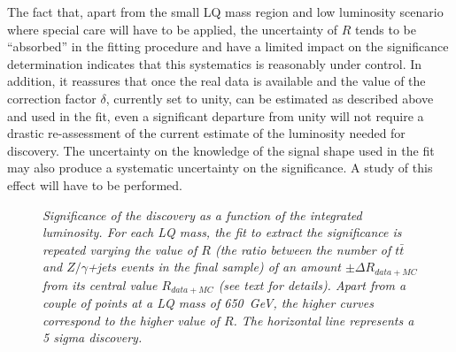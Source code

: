 The fact that, apart from the small LQ mass region and low luminosity scenario where special care
will have to be applied, the uncertainty 
of $R$ tends to be ``absorbed'' in the fitting procedure and have a limited impact on the 
significance determination indicates that this systematics is reasonably under control. 
In addition, it reassures that once the real data is available and the value of the correction 
factor $\delta$, currently set to unity, can be estimated as described above and used in the fit,
even a significant departure from unity will not require a drastic re-assessment of
the current estimate of the luminosity needed for discovery.
The uncertainty on the knowledge of the signal shape used in the fit may also produce a systematic
uncertainty on the significance. A study of this effect will have to be performed.

 \begin{figure}
   \begin{center}
     \caption{\small \sl Significance of the discovery as a function of the integrated luminosity.
       For each LQ mass, the fit to extract the significance is repeated varying the value of $R$
       (the ratio between the number of $t\bar{t}$ and $Z/\gamma$+jets events in the final sample)
       of an amount $\pm\Delta R_{data+MC}$ from its central value $R_{data+MC}$ 
       (see text for details).
       Apart from a couple of points at a LQ mass of 650~GeV, the higher curves correspond to
       the higher value of $R$. 
       The horizontal line represents a 5 sigma discovery.}
     \label{fig:sign_vs_Lint_sysR}
   \end{center}
 \end{figure}

